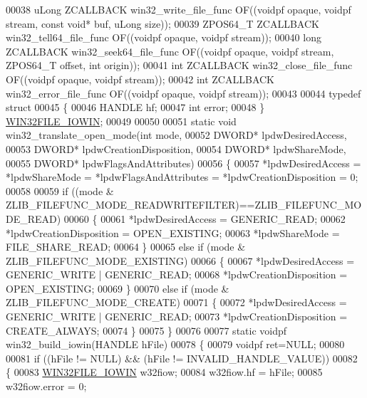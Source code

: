 \begin{DoxyCode}
00038 uLong   ZCALLBACK win32\_write\_file\_func OF((voidpf opaque, voidpf stream, \textcolor{keyword}{const} \textcolor{keywordtype}{void}* buf, uLong size));
00039 ZPOS64\_T ZCALLBACK win32\_tell64\_file\_func  OF((voidpf opaque, voidpf stream));
00040 \textcolor{keywordtype}{long}    ZCALLBACK win32\_seek64\_file\_func  OF((voidpf opaque, voidpf stream, ZPOS64\_T offset, \textcolor{keywordtype}{int} origin));
00041 \textcolor{keywordtype}{int}     ZCALLBACK win32\_close\_file\_func OF((voidpf opaque, voidpf stream));
00042 \textcolor{keywordtype}{int}     ZCALLBACK win32\_error\_file\_func OF((voidpf opaque, voidpf stream));
00043 
00044 \textcolor{keyword}{typedef} \textcolor{keyword}{struct}
00045 \{
00046     HANDLE hf;
00047     \textcolor{keywordtype}{int} error;
00048 \} \hyperlink{struct_w_i_n32_f_i_l_e___i_o_w_i_n}{WIN32FILE\_IOWIN};
00049 
00050 
00051 \textcolor{keyword}{static} \textcolor{keywordtype}{void} win32\_translate\_open\_mode(\textcolor{keywordtype}{int} mode,
00052                                       DWORD* lpdwDesiredAccess,
00053                                       DWORD* lpdwCreationDisposition,
00054                                       DWORD* lpdwShareMode,
00055                                       DWORD* lpdwFlagsAndAttributes)
00056 \{
00057     *lpdwDesiredAccess = *lpdwShareMode = *lpdwFlagsAndAttributes = *lpdwCreationDisposition = 0;
00058 
00059     \textcolor{keywordflow}{if} ((mode & ZLIB\_FILEFUNC\_MODE\_READWRITEFILTER)==ZLIB\_FILEFUNC\_MODE\_READ)
00060     \{
00061         *lpdwDesiredAccess = GENERIC\_READ;
00062         *lpdwCreationDisposition = OPEN\_EXISTING;
00063         *lpdwShareMode = FILE\_SHARE\_READ;
00064     \}
00065     \textcolor{keywordflow}{else} \textcolor{keywordflow}{if} (mode & ZLIB\_FILEFUNC\_MODE\_EXISTING)
00066     \{
00067         *lpdwDesiredAccess = GENERIC\_WRITE | GENERIC\_READ;
00068         *lpdwCreationDisposition = OPEN\_EXISTING;
00069     \}
00070     \textcolor{keywordflow}{else} \textcolor{keywordflow}{if} (mode & ZLIB\_FILEFUNC\_MODE\_CREATE)
00071     \{
00072         *lpdwDesiredAccess = GENERIC\_WRITE | GENERIC\_READ;
00073         *lpdwCreationDisposition = CREATE\_ALWAYS;
00074     \}
00075 \}
00076 
00077 \textcolor{keyword}{static} voidpf win32\_build\_iowin(HANDLE hFile)
00078 \{
00079     voidpf ret=NULL;
00080 
00081     \textcolor{keywordflow}{if} ((hFile != NULL) && (hFile != INVALID\_HANDLE\_VALUE))
00082     \{
00083         \hyperlink{struct_w_i_n32_f_i_l_e___i_o_w_i_n}{WIN32FILE\_IOWIN} w32fiow;
00084         w32fiow.hf = hFile;
00085         w32fiow.error = 0;

\end{DoxyCode}
